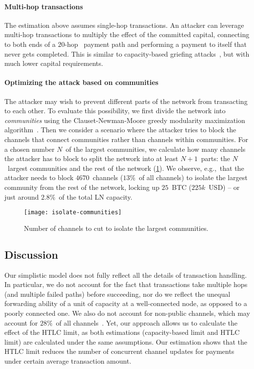 \paragraph{Multi-hop transactions}
The estimation above assumes single-hop transactions.
An attacker can leverage multi-hop transactions to multiply the effect of the committed capital, connecting to both ends of a $20$-hop~\cite{Bolt4OnionRouting} payment path and performing a payment to itself that never gets completed.
This is similar to capacity-based griefing attacks~\cite{HerreraJoancomarti2019}, but with much lower capital requirements.

\paragraph{Optimizing the attack based on communities}
The attacker may wish to prevent different parts of the network from transacting to each other.
To evaluate this possibility, we first divide the network into \textit{communities} using the Clauset-Newman-Moore greedy modularity maximization algorithm~\cite{Clauset2004}.
Then we consider a scenario where the attacker tries to block the channels that connect communities rather than channels within communities.
For a chosen number $N$~of the largest communities, we calculate how many channels the attacker has to block to split the network into at least $N+1$~parts: the $N$~largest communities and the rest of the network (\cref{fig:isolate-communities}).
We observe, e.g.,~that the attacker needs to block $4670$~channels ($13\%$~of all channels) to isolate the largest community from the rest of the network, locking up $25$~BTC ($225k$~USD) -- or just around $2.8\%$~of the total LN capacity.

\begin{figure}[tb]
	\centering
	\texttt{[image: isolate-communities]}
	\caption{Number of channels to cut to isolate the largest communities.\label{fig:isolate-communities}}
\end{figure}


\subsection{Discussion}
Our simplistic model does not fully reflect all the details of transaction handling.
In particular, we do not account for the fact that transactions take multiple hops (and multiple failed paths) before succeeding, nor do we reflect the unequal forwarding ability of a unit of capacity at a well-connected node, as opposed to a poorly connected one.
We also do not account for non-public channels, which may account for $28\%$~of all channels~\cite{BitMEXPrivateChannels}.
Yet, our approach allows us to calculate the effect of the HTLC limit, as both estimations (capacity-based limit and HTLC limit) are calculated under the same assumptions.
Our estimation shows that the HTLC limit reduces the number of concurrent channel updates for payments under certain average transaction amount.

